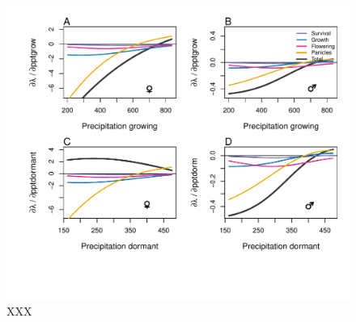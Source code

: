 \documentclass[12pt]{article}
\begin{document}
\begin{figure}[H]
  \begin{center}
    \includegraphics[width=0.85\linewidth]{Figures/LTRE_Precipitation.pdf}
  \caption{XXX}
  \label{Sup:LTREPPT}
  \end{center}
\end{figure}
\end{document}
